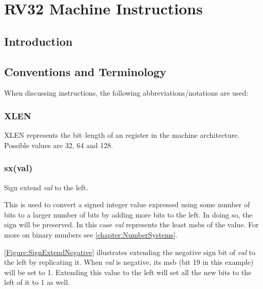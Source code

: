 \chapter{RV32 Machine Instructions}
\label{chapter:RV32}

\section{Introduction}



\section{Conventions and Terminology}

When discussing instructions, the following abbreviations/notations are used:

\subsection{XLEN}

XLEN represents the bit--length of an  register in the machine architecture.
Possible values are 32, 64 and 128.

\subsection{sx(val)}
\label{extension:sx}

Sign extend {\em val} to the left.

This is used to convert a signed integer value expressed using some number of 
bits to a larger number of bits by adding more bits to the left.  In doing so, 
the sign will be preserved.  In this case {\em val} represents the least 
\acrshort{msb}s of the value.  
For more on binary numbers see \autoref{chapter:NumberSystems}.

\autoref{Figure:SignExtendNegative} illustrates extending the negative sign 
bit of {\em val} to the left by replicating it.
When {\em val} is negative, its \acrshort{msb} (bit 19 in this example) will 
be set to 1.   Extending this value to the left will set all the new bits 
to the left of it to 1 as well.


